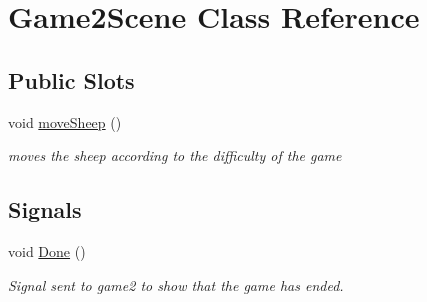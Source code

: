 \hypertarget{classGame2Scene}{\section{\-Game2\-Scene \-Class \-Reference}
\label{classGame2Scene}
}
\subsection*{\-Public \-Slots}
\begin{DoxyCompactItemize}
\item 
void \hyperlink{classGame2Scene_ada4c7bd4f05830b8bbe564c0fd726473}{move\-Sheep} ()
\begin{DoxyCompactList}\small\item\em moves the sheep according to the difficulty of the game \end{DoxyCompactList}\end{DoxyCompactItemize}
\subsection*{\-Signals}
\begin{DoxyCompactItemize}
\item 
\hypertarget{classGame2Scene_a20b7c1c31cdd14edd0a237abe36cab5a}{void \hyperlink{classGame2Scene_a20b7c1c31cdd14edd0a237abe36cab5a}{\-Done} ()}\label{classGame2Scene_a20b7c1c31cdd14edd0a237abe36cab5a}

\begin{DoxyCompactList}\small\item\em \-Signal sent to game2 to show that the game has ended. \end{DoxyCompactList}\end{DoxyCompactItemize}
